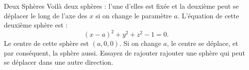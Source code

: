 \begin{surferPage}{Deux Sphères}
Voilà deux sphères : l'une d'elles est fixée et la deuxième peut se déplacer le long de l'axe des $x$ si on change le paramètre $a$.
L'équation de cette deuxième sphère est : 
\[(x-a)^2+y^2+z^2-1=0.\]
Le centre de cette sphère est $(a,0,0)$. Si on change $a$, le centre se déplace, et par conséquent, la sphère aussi. 
Essayez de rajouter rajouter une sphère qui peut se déplacer dans une autre direction.
\end{surferPage}